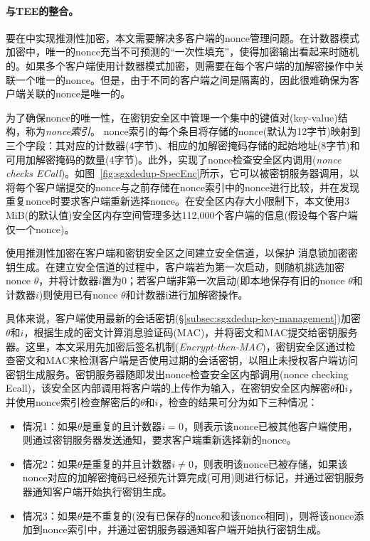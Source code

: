 \paragraph*{与TEE的整合。}要在\sysnameS 中实现推测性加密，本文需要解决多客户端的nonce管理问题。在计数器模式加密中，唯一的nonce充当不可预测的“一次性填充”，使得加密输出看起来时随机的\cite{counter}。如果多个客户端使用计数器模式加密，则需要在每个客户端的加解密操作中关联一个唯一的nonce。但是，由于不同的客户端之间是隔离的，因此很难确保为客户端关联的nonce是唯一的。

为了确保nonce的唯一性，\sysnameS 在密钥安全区中管理一个集中的键值对(key-value)结构，称为\textit{nonce索引}。 nonce索引的每个条目将存储的nonce(默认为12字节)映射到三个字段：其对应的计数器(4字节)、相应的加解密掩码存储的起始地址(8字节)和可用加解密掩码的数量(4字节)。此外，\sysnameS 实现了nonce检查安全区内调用(\textit{nonce checks ECall})。如图~\ref{fig:sgxdedup-SpecEnc}所示，它可以被密钥服务器调用，以将每个客户端提交的nonce与之前存储在nonce索引中的nonce进行比较，并在发现重复nonce时要求客户端重新选择nonce。在安全区内存大小限制下，本文使用3\,MiB(\sysnameS 的默认值)安全区内存空间管理多达112,000个客户端的信息(假设每个客户端仅一个nonce)。

\sysnameS 使用推测性加密在客户端和密钥安全区之间建立安全信道，以保护 消息锁加密密钥生成。在建立安全信道的过程中，客户端若为第一次启动，则随机挑选加密nonce $\theta$，并将计数器$i$置为0；若客户端非第一次启动(即本地保存有旧的nonce $\theta$和计数器$i$)则使用已有nonce $\theta$和计数器i进行加解密操作。

具体来说，客户端使用最新的会话密钥(\S\ref{subsec:sgxdedup-key-management})加密$\theta$和$i$，根据生成的密文计算消息验证码(MAC)，并将密文和MAC提交给密钥服务器。这里，本文采用先加密后签名机制(\textit{Encrypt-then-MAC})\cite{bellare2000Authenticated}，密钥安全区通过检查密文和MAC来检测客户端是否使用过期的会话密钥，以阻止未授权客户端访问密钥生成服务。密钥服务器随即发出nonce检查安全区内部调用(nonce checking Ecall)，该安全区内部调用将客户端的上传作为输入，在密钥安全区内解密$\theta$和$i$，并使用nonce索引检查解密后的$\theta$和$i$，检查的结果可分为如下三种情况：

\begin{itemize}[leftmargin=*]
    \item 情况1：如果$\theta$是重复的且计数器$i = 0$，则表示该nonce已被其他客户端使用，则通过密钥服务器发送通知，要求客户端重新选择新的nonce。
    \item 情况2：如果$\theta$是重复的并且计数器$i \neq 0$，则表明该nonce已被存储，如果该nonce对应的加解密掩码已经预先计算完成(可用)则进行标记，并通过密钥服务器通知客户端开始执行密钥生成。
    \item 情况3：如果$\theta$是不重复的(没有已保存的nonce和该nonce相同)，则将该nonce添加到nonce索引中，并通过密钥服务器通知客户端开始执行密钥生成。
\end{itemize}

